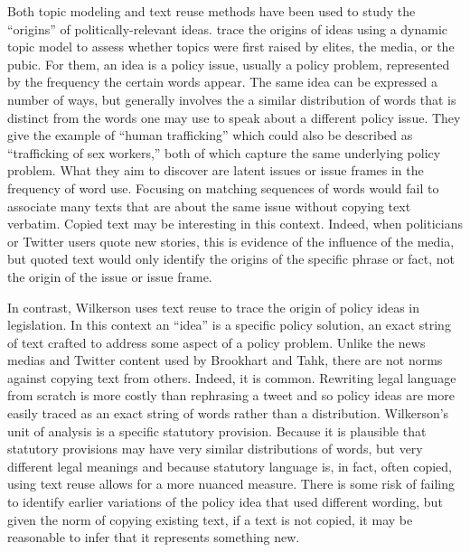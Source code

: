 \documentclass{article}
\begin{document}
Both topic modeling and text reuse methods have been used to study the ``origins'' of politically-relevant ideas. \citet{Brookhart2015} trace the origins of ideas using a dynamic topic model to assess whether topics were first raised by elites, the media, or the pubic. For them, an idea is a policy issue, usually a policy problem, represented by the frequency the certain words appear. The same idea can be expressed a number of ways, but generally involves the a similar distribution of words that is distinct from the words one may use to speak about a different policy issue. They give the example of ``human trafficking'' which could also be described as ``trafficking of sex workers,'' both of which capture the same underlying policy problem. What they aim to discover are latent issues or issue frames in the frequency of word use. Focusing on matching sequences of words would fail to associate many texts that are about the same issue without copying text verbatim. Copied text may be interesting in this context. Indeed, when politicians or Twitter users quote new stories, this is evidence of the influence of the media, but quoted text would only identify the origins of the specific phrase or fact, not the origin of the issue or issue frame.

In contrast, Wilkerson uses text reuse to trace the origin of policy ideas in legislation. In this context an ``idea'' is a specific policy solution, an exact string of text crafted to address some aspect of a policy problem. Unlike the news medias and Twitter content used by Brookhart and Tahk, there are not norms against copying text from others. Indeed, it is common. Rewriting legal language from scratch is more costly than rephrasing a tweet and so policy ideas are more easily traced as an exact string of words rather than a distribution. 
Wilkerson's unit of analysis is a specific statutory provision. Because it is plausible that statutory provisions may have very similar distributions of words, but very different legal meanings and because statutory language is, in fact, often copied, using text reuse allows for a more nuanced measure. There is some risk of failing to identify earlier variations of the policy idea that used different wording, but given the norm of copying existing text, if a text is not copied, it may be reasonable to infer that it represents something new. 


\end{document}
